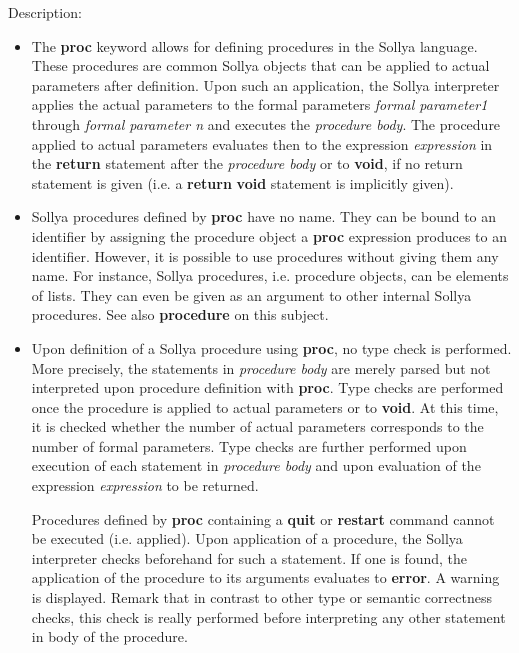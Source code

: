 \noindent Description: \begin{itemize}

\item The \textbf{proc} keyword allows for defining procedures in the Sollya
   language. These procedures are common Sollya objects that can be
   applied to actual parameters after definition. Upon such an
   application, the Sollya interpreter applies the actual parameters to
   the formal parameters \emph{formal parameter1} through \emph{formal parameter n}
   and executes the \emph{procedure body}. The procedure applied to actual
   parameters evaluates then to the expression \emph{expression} in the
   \textbf{return} statement after the \emph{procedure body} or to \textbf{void}, if no return
   statement is given (i.e. a \textbf{return} \textbf{void} statement is implicitly
   given).

\item Sollya procedures defined by \textbf{proc} have no name. They can be bound
   to an identifier by assigning the procedure object a \textbf{proc}
   expression produces to an identifier. However, it is possible to use
   procedures without giving them any name. For instance, Sollya
   procedures, i.e. procedure objects, can be elements of lists. They can
   even be given as an argument to other internal Sollya procedures. See
   also \textbf{procedure} on this subject.

\item Upon definition of a Sollya procedure using \textbf{proc}, no type check
   is performed. More precisely, the statements in \emph{procedure body} are
   merely parsed but not interpreted upon procedure definition with
   \textbf{proc}. Type checks are performed once the procedure is applied to
   actual parameters or to \textbf{void}. At this time, it is checked whether the
   number of actual parameters corresponds to the number of formal
   parameters. Type checks are further performed upon execution of each
   statement in \emph{procedure body} and upon evaluation of the expression
   \emph{expression} to be returned.
    
   Procedures defined by \textbf{proc} containing a \textbf{quit} or \textbf{restart} command
   cannot be executed (i.e. applied). Upon application of a procedure,
   the Sollya interpreter checks beforehand for such a statement. If one
   is found, the application of the procedure to its arguments evaluates
   to \textbf{error}. A warning is displayed. Remark that in contrast to other
   type or semantic correctness checks, this check is really performed
   before interpreting any other statement in body of the procedure.


\end{itemize}
